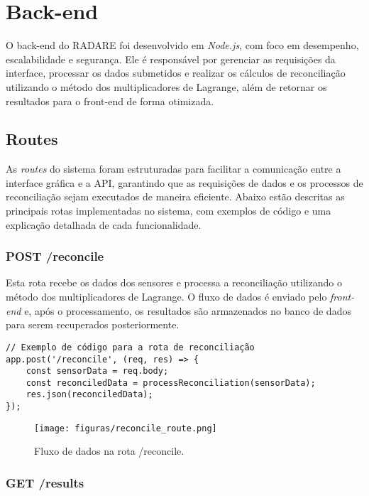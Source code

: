 \section{Back-end}

O back-end do RADARE foi desenvolvido em \textit{Node.js}, com foco em desempenho, escalabilidade e segurança. Ele é responsável por gerenciar as requisições da interface, processar os dados submetidos e realizar os cálculos de reconciliação utilizando o método dos multiplicadores de Lagrange, além de retornar os resultados para o front-end de forma otimizada.

\subsection{Routes}

As \textit{routes} do sistema foram estruturadas para facilitar a comunicação entre a interface gráfica e a API, garantindo que as requisições de dados e os processos de reconciliação sejam executados de maneira eficiente. Abaixo estão descritas as principais rotas implementadas no sistema, com exemplos de código e uma explicação detalhada de cada funcionalidade.

\subsubsection{POST /reconcile}

Esta rota recebe os dados dos sensores e processa a reconciliação utilizando o método dos multiplicadores de Lagrange. O fluxo de dados é enviado pelo \textit{front-end} e, após o processamento, os resultados são armazenados no banco de dados para serem recuperados posteriormente.

\begin{verbatim}
// Exemplo de código para a rota de reconciliação
app.post('/reconcile', (req, res) => {
    const sensorData = req.body;
    const reconciledData = processReconciliation(sensorData);
    res.json(reconciledData);
});
\end{verbatim}

\begin{figure}[htbp]
    \centering
    \texttt{[image: figuras/reconcile\_route.png]}
    \caption{Fluxo de dados na rota /reconcile.}
    \label{Fig:ReconcileRoute}
\end{figure}

\subsubsection{GET /results}

